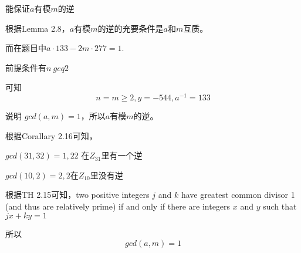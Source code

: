 \documentclass[a4paper, justified]{tufte-handout}
\begin{document}
\begin{problem}[CS 2.2-2]
\end{problem}

\begin{solution}
  能保证$a$有模$m$的逆

  根据Lemma 2.8，$a$有模$m$的逆的充要条件是$a$和$m$互质。

  而在题目中$a · 133 − 2m · 277 = 1$.

  前提条件有$n\ geq 2$

  可知$$n=m \geq2,y=-544,a^{-1}=133$$

  说明 $gcd(a,m) = 1$，所以$a$有模$m$的逆。


\end{solution}

\begin{problem}[CS 2.2-4]
\end{problem}

\begin{solution}
  根据Corallary 2.16可知，

  $gcd(31,32)=1,22$ 在$Z_{31}$里有一个逆

  $gcd(10,2)=2,2$在$Z_{10}$里没有逆
\end{solution}

\begin{problem}[CS 2.2-6]
\end{problem}

\begin{solution}
  根据TH 2.15可知，two positive integers $j$ and $k$ have greatest common divisor 1 (and thus are relatively prime) if and only if there are integers $x$ and $y$ such that $jx+ky=1$

  所以$$gcd(a,m)=1$$
\end{solution}
\end{document}
